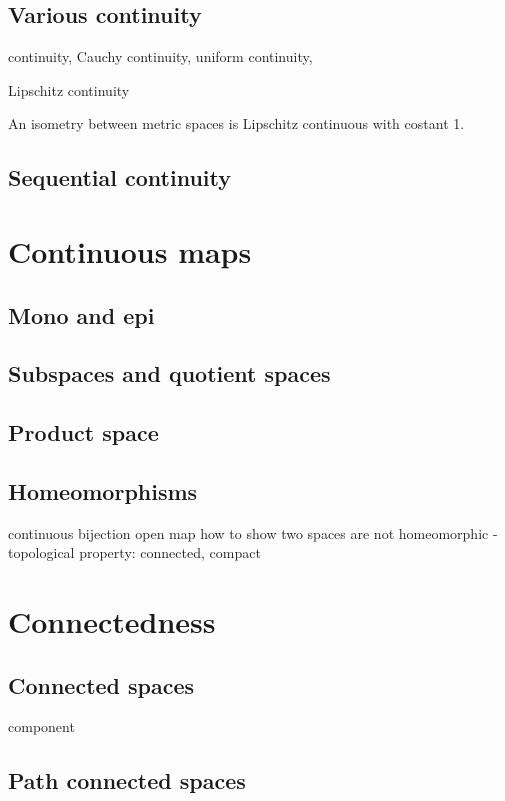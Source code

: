 \documentclass{../crs}
\begin{document}
\subsection{Various continuity}
continuity, Cauchy continuity, uniform continuity, 

Lipschitz continuity
\begin{ex}
An isometry between metric spaces is Lipschitz continuous with costant 1.
\end{ex}

\subsection{Sequential continuity}




\section{Continuous maps}

\subsection{Mono and epi}

\subsection{Subspaces and quotient spaces}

\subsection{Product space}

\subsection{Homeomorphisms}
continuous bijection
open map
how to show two spaces are not homeomorphic
- topological property: connected, compact


\section{Connectedness}

\subsection{Connected spaces}
component
\subsection{Path connected spaces}
\end{document}
